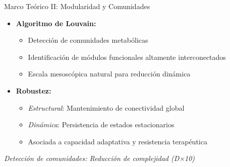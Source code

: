 \documentclass[aspectratio=169, 11pt]{beamer}
\begin{document}
	\begin{frame}{Marco Teórico II: Modularidad y Comunidades}
		\begin{itemize}
			\item \textbf{Algoritmo de Louvain:}
			\begin{itemize}
				\item Detección de comunidades metabólicas
				\item Identificación de módulos funcionales altamente interconectados
				\item Escala mesoscópica natural para reducción dinámica
			\end{itemize}
			
			\vspace{0.2cm}
			\item \textbf{Robustez:}
			\begin{itemize}
				\item \textit{Estructural}: Mantenimiento de conectividad global
				\item \textit{Dinámica}: Persistencia de estados estacionarios
				\item Asociada a capacidad adaptativa y resistencia terapéutica
			\end{itemize}
		\end{itemize}
		
		\vspace{0.3cm}
		\centering
		\footnotesize \textit{Detección de comunidades: Reducción de complejidad (D×10)}
	\end{frame}
	
\end{document}
